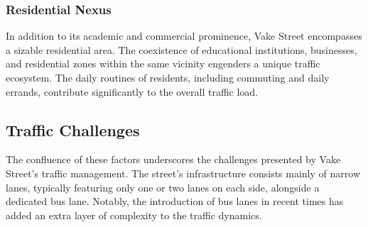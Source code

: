 \subsubsection{Residential Nexus}
In addition to its academic and commercial prominence, Vake Street encompasses a sizable residential area. The coexistence of educational institutions, businesses, and residential zones within the same vicinity engenders a unique traffic ecosystem. The daily routines of residents, including commuting and daily errands, contribute significantly to the overall traffic load.

\subsection{Traffic Challenges}
The confluence of these factors underscores the challenges presented by Vake Street's traffic management. The street's infrastructure consists mainly of narrow lanes, typically featuring only one or two lanes on each side, alongside a dedicated bus lane. Notably, the introduction of bus lanes in recent times has added an extra layer of complexity to the traffic dynamics.

